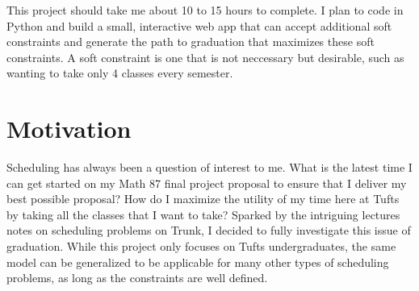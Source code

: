 \documentclass[11pt, oneside]{article}      %
\begin{document}
This project should take me about 10 to 15 hours to complete. I plan to code in Python and build a small, interactive web app that can accept additional soft constraints and generate the path to graduation that maximizes these soft constraints. A soft constraint is one that is not neccessary but desirable, such as wanting to take only 4 classes every semester.

\section{Motivation}
Scheduling has always been a question of interest to me. What is the latest time I can get started on my Math 87 final project proposal to ensure that I deliver my best possible proposal? How do I maximize the utility of my time here at Tufts by taking all the classes that I want to take? Sparked by the intriguing lectures notes on scheduling problems on Trunk, I decided to fully investigate this issue of graduation. While this project only focuses on Tufts undergraduates, the same model can be generalized to be applicable for many other types of scheduling problems, as long as the constraints are well defined. 
\end{document}
